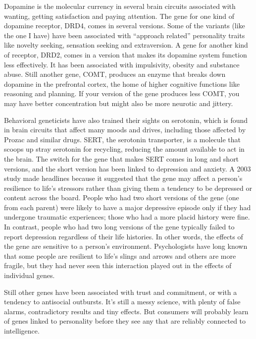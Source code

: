 Dopamine is the molecular currency in several brain circuits associated
with wanting, getting satisfaction and paying attention. The gene for
one kind of dopamine receptor, DRD4, comes in several versions. Some of
the variants (like the one I have) have been associated with ``approach
related'' personality traits like novelty seeking, sensation seeking and
extraversion. A gene for another kind of receptor, DRD2, comes in a
version that makes its dopamine system function less effectively. It has
been associated with impulsivity, obesity and substance abuse. Still
another gene, COMT, produces an enzyme that breaks down dopamine in the
prefrontal cortex, the home of higher cognitive functions like reasoning
and planning. If your version of the gene produces less COMT, you may
have better concentration but might also be more neurotic and jittery.

Behavioral geneticists have also trained their sights on serotonin,
which is found in brain circuits that affect many moods and drives,
including those affected by Prozac and similar drugs. SERT, the
serotonin transporter, is a molecule that scoops up stray serotonin for
recycling, reducing the amount available to act in the brain. The switch
for the gene that makes SERT comes in long and short versions, and the
short version has been linked to depression and anxiety. A 2003 study
made headlines because it suggested that the gene may affect a person's
resilience to life's stressors rather than giving them a tendency to be
depressed or content across the board. People who had two short versions
of the gene (one from each parent) were likely to have a major
depressive episode only if they had undergone traumatic experiences;
those who had a more placid history were fine. In contrast, people who
had two long versions of the gene typically failed to report depression
regardless of their life histories. In other words, the effects of the
gene are sensitive to a person's environment. Psychologists have long
known that some people are resilient to life's slings and arrows and
others are more fragile, but they had never seen this interaction played
out in the effects of individual genes.

Still other genes have been associated with trust and commitment, or
with a tendency to antisocial outbursts. It's still a messy science,
with plenty of false alarms, contradictory results and tiny effects. But
consumers will probably learn of genes linked to personality before they
see any that are reliably connected to intelligence.

